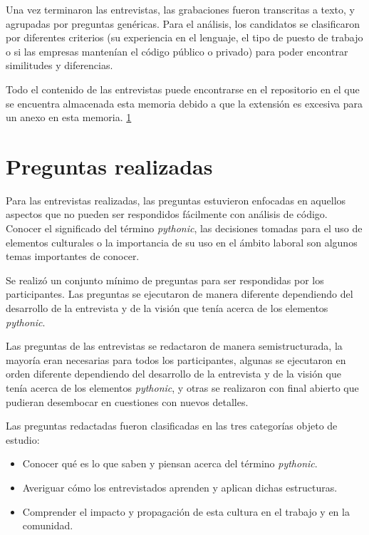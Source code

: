 \documentclass[a4paper, 12pt]{book}
\begin{document}
Una vez terminaron las entrevistas, las grabaciones fueron transcritas a texto, y agrupadas por preguntas genéricas. Para el análisis, los candidatos se clasificaron por diferentes criterios (su experiencia en el lenguaje, el tipo de puesto de trabajo o si las empresas mantenían el código público o privado) para poder encontrar similitudes y diferencias.

Todo el contenido de las entrevistas puede encontrarse en el repositorio en el que se encuentra almacenada esta memoria debido a que la extensión es excesiva para un anexo en esta memoria. \ref{}


\section{Preguntas realizadas}

Para las entrevistas realizadas, las preguntas estuvieron enfocadas en aquellos aspectos que no pueden ser respondidos fácilmente con análisis de código. Conocer el significado del término \textit{pythonic}, las decisiones tomadas para el uso de elementos culturales o la importancia de su uso en el ámbito laboral son algunos temas importantes de conocer.

Se realizó un conjunto mínimo de preguntas para ser respondidas por los participantes. Las preguntas se ejecutaron de manera diferente dependiendo del desarrollo de la entrevista y de la visión que tenía acerca de los elementos \textit{pythonic}.

Las preguntas de las entrevistas se redactaron de manera semistructurada\cite{merriam2009qualitative}, la mayoría eran necesarias para todos los participantes, algunas se ejecutaron en orden diferente dependiendo del desarrollo de la entrevista y de la visión que tenía acerca de los elementos \textit{pythonic}, y otras se realizaron con final abierto que pudieran desembocar en cuestiones con nuevos detalles.

Las preguntas redactadas fueron clasificadas en las tres categorías objeto de estudio:
\begin{itemize}
    \item Conocer qué es lo que saben y piensan acerca del término \textit{pythonic}. 

    \item Averiguar cómo los entrevistados aprenden y aplican dichas estructuras.
    
    \item Comprender el impacto y propagación de esta cultura en el trabajo y en la comunidad.
\end{itemize}
\end{document}
